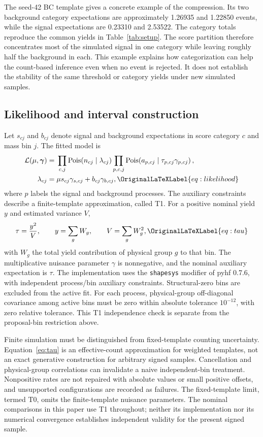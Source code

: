 \documentclass[aps,prd,reprint,superscriptaddress,nofootinbib,longbibliography,floatfix]{revtex4-2}
\let\label\OriginalLaTeXLabel
\newcommand{\Pois}{\operatorname{Pois}}
\begin{document}
The seed-42 BC template gives a concrete example of the compression.
Its two background category expectations are approximately 1.26935 and
1.22850 events, while the signal expectations are 0.23310 and 2.53522.
The category totals reproduce the common yields in Table~\ref{tab:setup}.
The score partition therefore concentrates most of the simulated signal
in one category while leaving roughly half the background in each.
This example explains how categorization can help the count-based inference
even when no event is rejected. It does not establish the stability of
the same threshold or category yields under new simulated samples.

\subsection{Likelihood and interval construction}

Let $s_{cj}$ and $b_{cj}$ denote signal and background expectations in score
category $c$ and mass bin $j$. The fitted model is
\begin{align}
 \mathcal L(\mu,\bm\gamma)={}&
 \prod_{c,j}\Pois\!\left(n_{cj}\mid\lambda_{cj}\right)
 \prod_{p,c,j}\Pois\!\left(a_{p,cj}\mid
       \tau_{p,cj}\gamma_{p,cj}\right),\nonumber\\
 \lambda_{cj}={}&\mu s_{cj}\gamma_{s,cj}+b_{cj}\gamma_{b,cj},
 \label{eq:likelihood}
\end{align}
where $p$ labels the signal and background processes. The auxiliary
constraints describe a finite-template approximation, called T1. For a
positive nominal yield $y$ and estimated variance $V$,
\begin{equation}
 \tau=\frac{y^2}{V},\qquad
 y=\sum_g W_g,\qquad V=\sum_g W_g^2,
 \label{eq:tau}
\end{equation}
with $W_g$ the total yield contribution of physical group $g$ to that bin.
The multiplicative nuisance parameter $\gamma$ is nonnegative, and the
nominal auxiliary expectation is $\tau$. The implementation uses the
\texttt{shapesys} modifier of pyhf 0.7.6\cite{pyhf2021,pyhf076}, with
independent process/bin auxiliary constraints.
Structural-zero bins are excluded from the active fit. For each process,
physical-group off-diagonal covariance among active bins must be zero within
absolute tolerance $10^{-12}$, with zero relative tolerance. This T1
independence check is separate from the proposal-bin restriction above.

Finite simulation must be distinguished from fixed-template counting
uncertainty\cite{Barlow1993}. Equation~\eqref{eq:tau} is an effective-count
approximation for weighted templates, not an exact generative construction
for arbitrary signed samples. Cancellation and physical-group correlations
can invalidate a naive independent-bin treatment. Nonpositive rates are not
repaired with absolute values or small positive offsets, and unsupported
configurations are recorded as failures. The fixed-template limit, termed
T0, omits the finite-template nuisance parameters. The nominal comparisons
in this paper use T1 throughout; neither its implementation nor its numerical
convergence establishes independent validity for the present signed sample.
\end{document}
